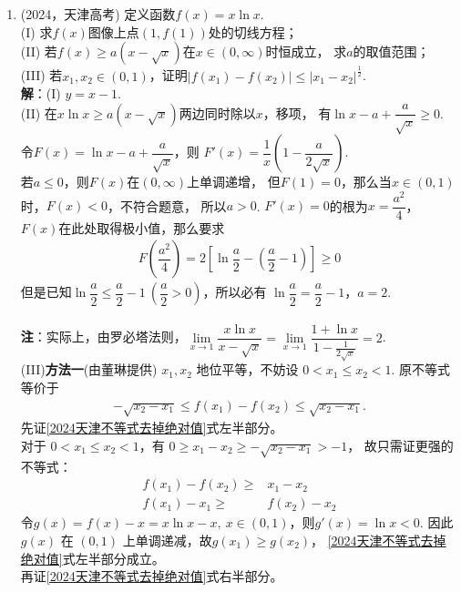 \begin{enumerate}[label={【\textbf{例\thechapter.\arabic*}】},
 leftmargin=\inteval{\myenumleftmargin}pt,
 itemsep=\inteval{\myenumitempsep}pt,
 itemindent=\inteval{\myenumitemindent}pt]
\item (2024，天津高考)	定义函数$f(x)=x\ln x$.\\
(I) 求$f(x)$图像上点$(1,f(1))$处的切线方程；\\
(II) 若$f(x)\geq a(x-\sqrt{x})$在$x\in(0,\infty)$时恒成立，
求$a$的取值范围；\\
(III) 若$x_1,x_2\in(0,1)$，证明$|f(x_1)-f(x_2)|\leq|x_1-x_2|^{\frac{1}{2}}$. \\
\textbf{解}：(I) $y=x-1$. \\
(II) 在$ x\ln x\geq a(x-\sqrt{x})$两边同时除以$x$，移项，
有$\ln x-a+\dfrac{a}{\sqrt{x}}\geq 0$.  
令$F(x)=\ln x-a+\dfrac{a}{\sqrt{x}}$，则
$F'(x)=\dfrac{1}{x}\left(1-\dfrac{a}{2\sqrt{x}}\right)$.\\
若$a\leq 0$，则$F(x)$在$(0,\infty)$上单调递增，
但$F(1)=0$，那么当$x\in(0,1)$时，$F(x)<0$，不符合题意，
所以$a>0$. $F'(x)=0$的根为$x=\dfrac{a^2}{4}$，
$F(x)$在此处取得极小值，那么要求
\begin{gather*}
    F\left(\dfrac{a^2}{4}\right)=
    2\left[\ln\dfrac{a}{2}-\left(\dfrac{a}{2}-1\right)\right] \geq 0
\end{gather*}
但是已知$ \ln\dfrac{a}{2}\leq \dfrac{a}{2}-1\ 
\left(\dfrac{a}{2}>0\right) $，所以必有
$\ln\dfrac{a}{2}=\dfrac{a}{2}-1$，$a=2$. \\\\
\textbf{注}：实际上，由罗必塔法则，$\lim\limits_{x\to 1}
\dfrac{x\ln x}{x-\sqrt{x}}=\lim\limits_{x\to 1}
\dfrac{1+\ln x}{1-\frac{1}{2\sqrt{x}}}=2$. \\
(III)\textbf{方法一}(由董琳提供) \(x_1, x_2\) 地位平等，不妨设
\(0 < x_1 \leq x_2 < 1\). 原不等式等价于
\begin{align}\label{2024天津不等式去掉绝对值}
    -\sqrt{x_2 - x_1} \leq f(x_1) - f(x_2) \leq \sqrt{x_2 - x_1}. 
\end{align}
先证\eqref{2024天津不等式去掉绝对值}式左半部分。\\
对于 \(0 < x_1 \leq x_2 < 1\)，有 \(0 \geq x_1 - x_2 \geq -\sqrt{x_2 - x_1} > -1\)，
故只需证更强的不等式：
\begin{align*}
    f(x_1) - f(x_2) \geq & x_1 - x_2   \\
    f(x_1) - x_1    \geq & f(x_2) - x_2  
\end{align*}
令$ g(x) = f(x) - x=x\ln x-x,\ x \in (0,1) $，则$g'(x)=\ln x < 0$.
因此 \(g(x)\) 在 \((0,1)\) 上单调递减，故$g(x_1) \geq g(x_2)$，
\eqref{2024天津不等式去掉绝对值}式左半部分成立。\\
再证\eqref{2024天津不等式去掉绝对值}式右半部分。\\

\end{enumerate}
